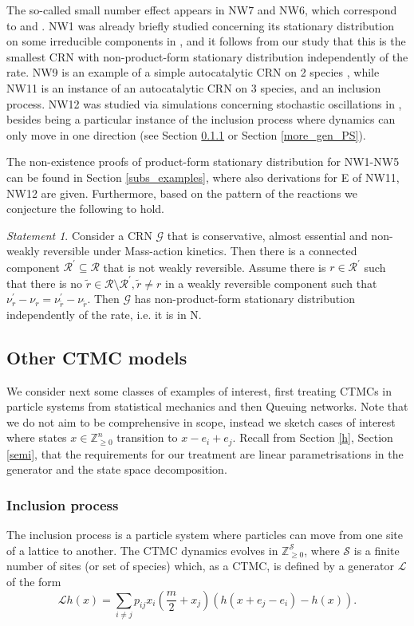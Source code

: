 \documentclass{amsart}
\theoremstyle{definition}
\theoremstyle{remark}
\theoremstyle{Conjecture/open problem}
\theoremstyle{assumption}
\theoremstyle{conjecture}
\newtheorem{conjecture}{Statement}
\def\p{^{\prime}}
\def\cG{\mathcal{G}}
\def\cR{\mathcal{R}}
\def\cS{\mathcal{S}}
\def\Z{\mathbb{Z}}
\numberwithin{equation}{section}
\begin{document}
The so-called small number effect appears in NW7 and NW6, which correspond to \cite[Motif F]{Saito2} and \cite[Motif G]{Saito2}. NW1 was already briefly studied concerning its stationary distribution on some irreducible components in \cite[Example 2]{Cappelletti}, and it follows from our study that this is the smallest CRN with non-product-form stationary distribution independently of the rate.
NW9 is an example of a simple autocatalytic CRN on 2 species \cite{hoesslysta}, while NW11 is an instance of an autocatalytic CRN on 3 species, and an inclusion process. NW12 was studied via simulations concerning stochastic oscillations in \cite{Spieler_stoch_osc}, besides being a particular instance of the inclusion process where dynamics can only move in one direction (see Section \ref{icl} or Section \ref{more_gen_PS}).

The non-existence proofs of product-form stationary distribution for NW1-NW5 can be found in Section \ref{subs_examples}, where also derivations for E of NW11, NW12 are given.
Furthermore, based on the pattern of the reactions we conjecture the following to hold.
\begin{conjecture}
Consider a CRN $\cG$ that is conservative, almost essential and non-weakly reversible under Mass-action kinetics. Then there is a connected component $\cR\p\subseteq \cR$ that is not weakly reversible. Assume there is $r\in\cR\p$ such that there is no $\tilde{r}\in\cR\setminus \cR\p, \tilde{r}\neq r$ in a weakly reversible component such that $\nu _r\p-\nu _r=\nu _{\tilde{r}}\p-\nu _{\tilde{r}}$. Then $\cG$ has non-product-form stationary distribution independently of the rate, i.e. it is in N.
\end{conjecture}


\subsection{Other CTMC models}\label{subs_other_m}
 We consider next some classes of examples of interest, first treating CTMCs in particle systems from statistical mechanics and then Queuing networks. Note that we do not aim to be comprehensive in scope, instead we sketch cases of interest where states $x\in\Z^n_{\geq 0}$ transition to $x-e_i+e_j$.  Recall from Section \ref{h}, Section \ref{semi}, that the requirements for our treatment are linear parametrisations in the generator and the state space decomposition.
\subsubsection{Inclusion process}\label{icl}
The inclusion process \cite{Giardina2009,hoesslysta} is a particle system where particles can move from one site of a lattice  to another.
The CTMC dynamics evolves in 
$\Z_{\geq 0}^{\cS}$, where $\cS$ is a finite number of sites (or set of species) which, as a CTMC, is defined by a generator $\mathcal{L}$ of the form
$$\mathcal{L}h(x)=\sum_{i\ne j} p_{ij}x_i (\frac{m}{2}+x_j)(h(x+e_j-e_i)-h(x)).$$
\end{document}
